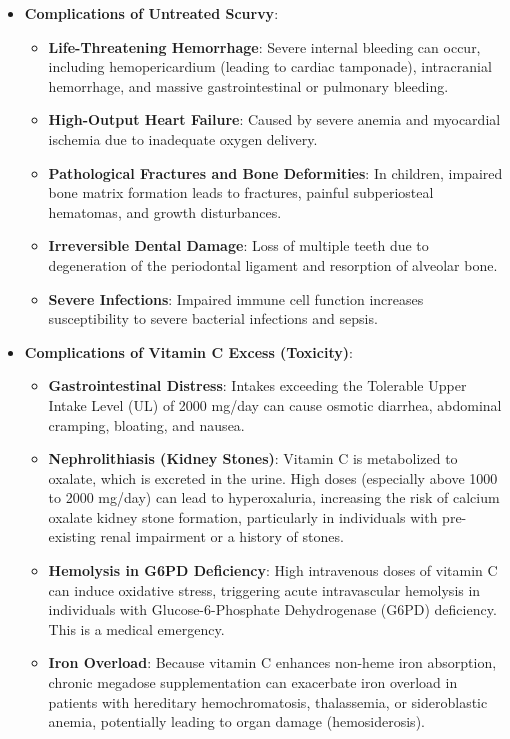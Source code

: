 \begin{itemize}
    \item \textbf{Complications of Untreated Scurvy}:
        \begin{itemize}
            \item \textbf{Life-Threatening Hemorrhage}: Severe internal bleeding can occur, including hemopericardium (leading to cardiac tamponade), intracranial hemorrhage, and massive gastrointestinal or pulmonary bleeding.
            \item \textbf{High-Output Heart Failure}: Caused by severe anemia and myocardial ischemia due to inadequate oxygen delivery.
            \item \textbf{Pathological Fractures and Bone Deformities}: In children, impaired bone matrix formation leads to fractures, painful subperiosteal hematomas, and growth disturbances.
            \item \textbf{Irreversible Dental Damage}: Loss of multiple teeth due to degeneration of the periodontal ligament and resorption of alveolar bone.
            \item \textbf{Severe Infections}: Impaired immune cell function increases susceptibility to severe bacterial infections and sepsis.
        \end{itemize}
    \item \textbf{Complications of Vitamin C Excess (Toxicity)}:
        \begin{itemize}
            \item \textbf{Gastrointestinal Distress}: Intakes exceeding the Tolerable Upper Intake Level (UL) of 2000 mg/day can cause osmotic diarrhea, abdominal cramping, bloating, and nausea.
            \item \textbf{Nephrolithiasis (Kidney Stones)}: Vitamin C is metabolized to oxalate, which is excreted in the urine. High doses (especially above 1000 to 2000 mg/day) can lead to hyperoxaluria, increasing the risk of calcium oxalate kidney stone formation, particularly in individuals with pre-existing renal impairment or a history of stones.
            \item \textbf{Hemolysis in G6PD Deficiency}: High intravenous doses of vitamin C can induce oxidative stress, triggering acute intravascular hemolysis in individuals with Glucose-6-Phosphate Dehydrogenase (G6PD) deficiency. This is a medical emergency.
            \item \textbf{Iron Overload}: Because vitamin C enhances non-heme iron absorption, chronic megadose supplementation can exacerbate iron overload in patients with hereditary hemochromatosis, thalassemia, or sideroblastic anemia, potentially leading to organ damage (hemosiderosis).
        \end{itemize}
\end{itemize}

